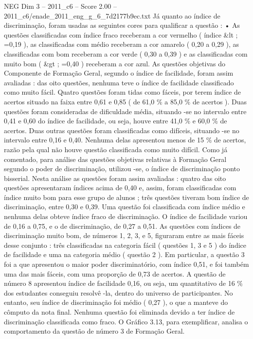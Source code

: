 \begin{textsample}{NEG Dim 3 – 2011\_c6 – Score 2.00 – 2011\_c6/enade\_2011\_eng\_g\_6\_7d2177b9ec.txt}
Já quanto ao índice de discriminação, foram usadas as seguintes cores para qualificar a questão : • As questões classificadas com índice fraco receberam a cor vermelho ( índice \&lt ; =0,19 ), as classificadas com médio receberam a cor amarelo ( 0,20 a 0,29 ), as classificadas com bom receberam a cor verde ( 0,30 a 0,39 ) e as classificadas com muito bom ( \&gt ; =0,40 ) receberam a cor azul.
As questões objetivas do Componente de Formação Geral, segundo o índice de facilidade, foram assim avaliadas : das oito questões, nenhuma teve o índice de facilidade classificado como muito fácil.
Quatro questões foram tidas como fáceis, por terem índice de acertos situado na faixa entre 0,61 e 0,85 ( de 61,0 \% a 85,0 \% de acertos ).
Duas questões foram consideradas de dificuldade média, situando -se no intervalo entre 0,41 e 0,60 do índice de facilidade, ou seja, houve entre 41,0 \% e 60,0 \% de acertos.
Duas outras questões foram classificadas como difíceis, situando -se no intervalo entre 0,16 e 0,40.
Nenhuma delas apresentou menos de 15 \% de acertos, razão pela qual não houve questão classificada como muito difícil.
Como já comentado, para análise das questões objetivas relativas à Formação Geral segundo o poder de discriminação, utilizou -se, o índice de discriminação ponto bisserial.
Nesta análise as questões foram assim avaliadas : quatro das oito questões apresentaram índices acima de 0,40 e, assim, foram classificadas com índice muito bom para esse grupo de alunos ; três questões tiveram bom índice de discriminação, entre 0,30 e 0,39.
Uma questão foi classificada com índice médio e nenhuma delas obteve índice fraco de discriminação.
O índice de facilidade variou de 0,16 a 0,75, e o de discriminação, de 0,27 a 0,51.
As questões com índices de discriminação muito bom, de números 1, 2, 3, e 5, figuraram entre as mais fáceis desse conjunto : três classificadas na categoria fácil ( questões 1, 3 e 5 ) do índice de facilidade e uma na categoria médio ( questão 2 ).
Em particular, a questão 3 foi a que apresentou o maior poder discriminatório, com índice 0,51, e foi também uma das mais fáceis, com uma proporção de 0,73 de acertos.
A questão de número 8 apresentou índice de facilidade 0,16, ou seja, um quantitativo de 16 \% dos estudantes conseguiu resolvê -la, dentro do universo de participantes.
No entanto, seu índice de discriminação foi médio ( 0,27 ), o que a manteve do cômputo da nota final.
Nenhuma questão foi eliminada devido a ter índice de discriminação classificada como fraco.
O Gráfico 3.13, para exemplificar, analisa o comportamento da questão de número 3 de Formação Geral.

\end{textsample}
